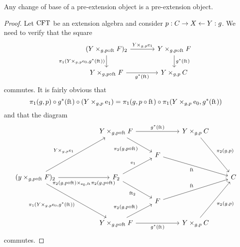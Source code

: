 \begin{lem}\label{cobesys-preext}
Any change of base of a pre-extension object is a pre-extension object.
\end{lem}

\begin{proof}
Let $\mathrm{CFT}$ be an extension algebra and consider $p:C\rightarrow X\leftarrow Y:g$.
We need to verify that the square
\begin{equation*}
\begin{tikzcd}[column sep=large]
(\pullback{Y}{\stesysf}{g}{p\circ\eft})_2
  \ar{r}{\cobesys{Y}{\efamext}{g}{p}} 
  \ar{d}[swap]{\pullbackpr{1}{\cobesys{Y}{\ectxext}{g}{p}}{g^\ast(\eft)}} 
  & 
\pullback{Y}{\stesysf}{g}{p\circ\eft}
  \ar{d}{g^\ast(\eft)}
  \\
\pullback{Y}{\stesysf}{g}{p\circ\eft}
  \ar{r}[swap]{g^\ast(\eft)} 
  & 
\pullback{Y}{\stesysc}{g}{p}
\end{tikzcd}
\end{equation*}
commutes. It is fairly obvious that
\begin{equation*}
\pullbackpr{1}{g}{p}\circ g^\ast(\eft)\circ (\cobesys{Y}{\efamext}{g}{p})
  =
\pullbackpr{1}{g}{p\circ\eft}\circ \pullbackpr{1}{\cobesys{Y}{\ectxext}{g}{p}}{g^\ast(\eft)}
\end{equation*}
and that the diagram
\begin{equation*}
\begin{tikzcd}
  {}&
  {}&
\pullback{Y}{\stesysf}{g}{p\circ\eft}
  \ar{rr}{g^\ast(\eft)}
  \ar{dr}[swap]{\pullbackpr{2}{g}{p\circ\eft}}
  &
  {}&
\pullback{Y}{\stesysc}{g}{p}
  \ar{ddr}{\pullbackpr{2}{g}{p}}
  \\
  {}&
  {}&
  {}&
\stesysf
  \ar{drr}[swap]{\eft}
  \\
(\pullback{y}{\stesysf}{g}{p\circ\eft})_2
  \ar{uurr}{\cobesys{Y}{\efamext}{g}{p}}
  \ar{rr}[swap,yshift=-.5ex]{\pullback{\pullbackpr{2}{g}{p\circ\eft}}{\pullbackpr{2}{g}{p\circ\eft}}{\ectxext}{\eft}}
  \ar{ddrr}[swap]{\pullbackpr{1}{\cobesys{Y}{\ectxext}{g}{p}}{g^\ast(\eft)}}
  &
  {}&
\stesysf_2
  \ar{ur}{\efamext}
  \ar{dr}[swap]{\eft[2]}
  &
  {}&
  {}&
\stesysc
  \\
  {}&
  {}&
  {}&
\stesysf
  \ar{urr}{\eft}
  \\
  {}&
  {}&
\pullback{Y}{\stesysf}{g}{p\circ\eft}
  \ar{rr}[swap]{g^\ast(\eft)}
  \ar{ur}{\pullbackpr{2}{g}{p\circ\eft}}
  &
  {}&
\pullback{Y}{\stesysc}{g}{p}
  \ar{uur}[swap]{\pullbackpr{2}{g}{p}}
\end{tikzcd}
\end{equation*}
commutes.
\end{proof}

